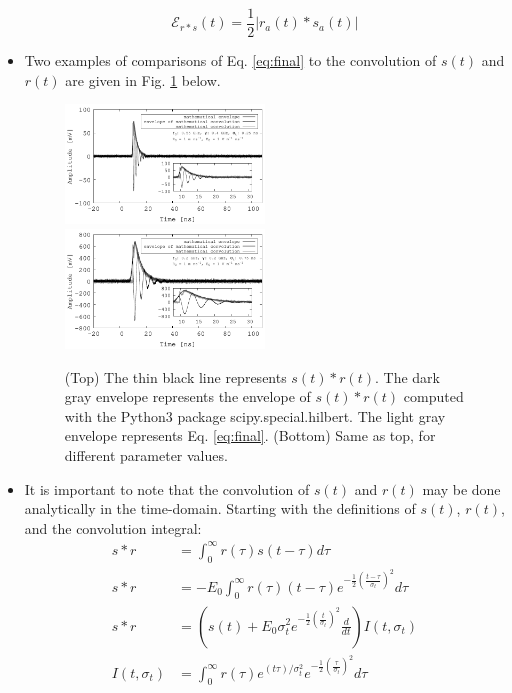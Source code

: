 \documentclass[amsmath,amssymb,aps,prd,10pt,twocolumn,showkeys]{revtex4}
\begin{document}
\begin{itemize}
\begin{equation}
\mathcal{E}_{r * s}(t) = \frac{1}{2} | r_a(t) * s_a(t) |
\end{equation}
\item Two examples of comparisons of Eq. \ref{eq:final} to the convolution of $s(t)$ and $r(t)$ are given in Fig. \ref{fig:fig1} below.
\begin{figure}[hb]
\centering
\includegraphics[width=0.5\textwidth]{March12_plot1.pdf}
\includegraphics[width=0.5\textwidth]{March12_plot2.pdf}
\caption{\label{fig:fig1} (Top) The thin black line represents $s(t) * r(t)$.  The dark gray envelope represents the envelope of $s(t) * r(t)$ computed with the Python3 package scipy.special.hilbert. The light gray envelope represents Eq. \ref{eq:final}. (Bottom) Same as top, for different parameter values.}
\end{figure}
\item It is important to note that the convolution of $s(t)$ and $r(t)$ may be done analytically in the time-domain.  Starting with the definitions of $s(t)$, $r(t)$, and the convolution integral:
\begin{align}
s * r &= \int_0^{\infty} r(\tau) s(t-\tau) d\tau \\
s * r &= -E_0 \int_0^{\infty} r(\tau) (t-\tau) e^{-\frac{1}{2}\left(\frac{t-\tau}{\sigma_t}\right)^2}d\tau \\
s * r &= \left(s(t) + E_0 \sigma_t^2 e^{-\frac{1}{2}\left(\frac{t}{\sigma_t}\right)^2} \frac{d}{dt} \right)I(t,\sigma_t) \label{eq:conv_1} \\
I(t,\sigma_t) &= \int_0^{\infty} r(\tau) e^{(t\tau)/\sigma_t^2} e^{-\frac{1}{2}\left(\frac{\tau}{\sigma_t}\right)^2}d\tau
\end{align}

\end{itemize}
\end{document}
